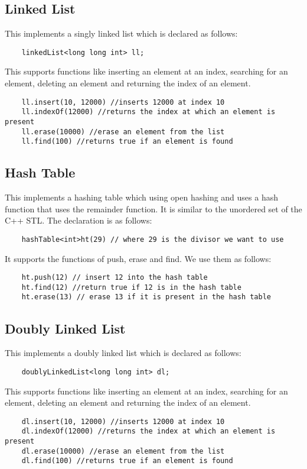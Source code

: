 \documentclass[12pt]{article}
\begin{document}
\subsection{Linked List}
This implements a singly linked list which is declared as follows:
\begin{verbatim}
    linkedList<long long int> ll;
\end{verbatim}
This supports functions like inserting an element at an index, searching for an element, deleting an element and returning the index of an element.
\begin{verbatim}
    ll.insert(10, 12000) //inserts 12000 at index 10
    ll.indexOf(12000) //returns the index at which an element is present
    ll.erase(10000) //erase an element from the list
    ll.find(100) //returns true if an element is found
\end{verbatim}

\subsection{Hash Table}
This implements a hashing table which using open hashing and uses a hash function that uses the remainder function. It is similar to the unordered set of the C++ STL. The declaration is as follows:
\begin{verbatim}
    hashTable<int>ht(29) // where 29 is the divisor we want to use
\end{verbatim}
It supports the functions of push, erase and find. We use them as follows:
\begin{verbatim}
    ht.push(12) // insert 12 into the hash table
    ht.find(12) //return true if 12 is in the hash table
    ht.erase(13) // erase 13 if it is present in the hash table 
\end{verbatim}

\subsection{Doubly Linked List}
This implements a doubly linked list which is declared as follows:
\begin{verbatim}
    doublyLinkedList<long long int> dl;
\end{verbatim}
This supports functions like inserting an element at an index, searching for an element, deleting an element and returning the index of an element.
\begin{verbatim}
    dl.insert(10, 12000) //inserts 12000 at index 10
    dl.indexOf(12000) //returns the index at which an element is present
    dl.erase(10000) //erase an element from the list
    dl.find(100) //returns true if an element is found
\end{verbatim}
\end{document}
